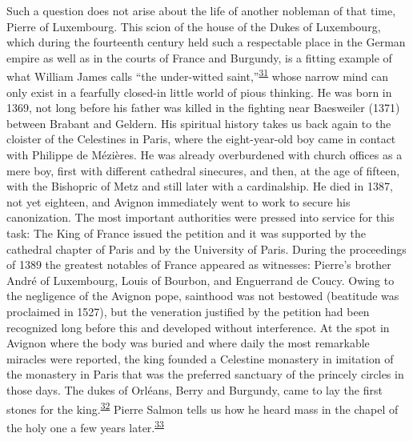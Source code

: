 Such a question does not arise about the life of another nobleman of
that time, Pierre of Luxembourg. This scion of the house of the Dukes of
Luxembourg, which during the fourteenth century held such a respectable
place in the German empire as well as in the courts of France and
Burgundy, is a fitting example of what William James calls ``the
under-witted
saint,''\textsuperscript{\protect\hypertarget{14_Chapter_Seven__THE_PIOUS_PERSONA.xhtmlux5cux23id_962}{\protect\hyperlink{23_NOTES.xhtmlux5cux23id_963}{31}}}
whose narrow mind can only exist in a fearfully closed-in little world
of pious thinking.
\protect\hypertarget{14_Chapter_Seven__THE_PIOUS_PERSONA.xhtmlux5cux23page_213}{}{}He
was born in 1369, not long before his father was killed in the fighting
near Baesweiler (1371) between Brabant and Geldern. His spiritual
history takes us back again to the cloister of the Celestines in Paris,
where the eight-year-old boy came in contact with Philippe de Mézières.
He was already overburdened with church offices as a mere boy, first
with different cathedral sinecures, and then, at the age of fifteen,
with the Bishopric of Metz and still later with a cardinalship. He died
in 1387, not yet eighteen, and Avignon immediately went to work to
secure his canonization. The most important authorities were pressed
into service for this task: The King of France issued the petition and
it was supported by the cathedral chapter of Paris and by the University
of Paris. During the proceedings of 1389 the greatest notables of France
appeared as witnesses: Pierre's brother André of Luxembourg, Louis of
Bourbon, and Enguerrand de Coucy. Owing to the negligence of the Avignon
pope, sainthood was not bestowed (beatitude was proclaimed in 1527), but
the veneration justified by the petition had been recognized long before
this and developed without interference. At the spot in Avignon where
the body was buried and where daily the most remarkable miracles were
reported, the king founded a Celestine monastery in imitation of the
monastery in Paris that was the preferred sanctuary of the princely
circles in those days. The dukes of Orléans, Berry and Burgundy, came to
lay the first stones for the
king.\textsuperscript{\protect\hypertarget{14_Chapter_Seven__THE_PIOUS_PERSONA.xhtmlux5cux23id_960}{\protect\hyperlink{23_NOTES.xhtmlux5cux23id_961}{32}}}
Pierre Salmon tells us how he heard mass in the chapel of the holy one a
few years
later.\textsuperscript{\protect\hypertarget{14_Chapter_Seven__THE_PIOUS_PERSONA.xhtmlux5cux23id_958}{\protect\hyperlink{23_NOTES.xhtmlux5cux23id_959}{33}}}

